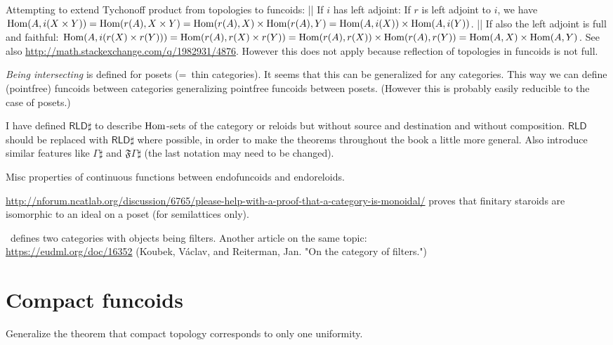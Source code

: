 \documentclass{amsart}
\begin{document}
Attempting to extend Tychonoff product from topologies to funcoids:
|| If $i$ has left adjoint:
If $r$ is left adjoint to $i$, we have $\operatorname{Hom}(A, i(X\times Y)) = \operatorname{Hom}(r(A), X\times Y) = \operatorname{Hom}(r(A), X)\times \operatorname{Hom}(r(A), Y) = \operatorname{Hom}(A, i(X))\times \operatorname{Hom}(A, i(Y))$.
|| If also the left adjoint is full and faithful:
$\operatorname{Hom}(A, i(r(X)\times r(Y))) = \operatorname{Hom}(r(A), r(X)\times r(Y)) = \operatorname{Hom}(r(A), r(X))\times \operatorname{Hom}(r(A), r(Y)) = \operatorname{Hom}(A, X)\times \operatorname{Hom}(A, Y)$.
See also \url{http://math.stackexchange.com/q/1982931/4876}. However this does not apply because reflection of topologies in funcoids
is not full.

\emph{Being intersecting} is defined for posets (=~thin categories). It seems that this can be generalized for any categories.
This way we can define (pointfree) funcoids between categories generalizing pointfree funcoids between posets.
(However this is probably easily reducible to the case of posets.)

I have defined $\mathsf{RLD}\sharp$ to describe $\operatorname{Hom}$-sets of the category or reloids but without source and destination and without composition.
$\mathsf{RLD}$ should be replaced with $\mathsf{RLD}\sharp$ where possible, in order to make the theorems throughout the book a little more general.
Also introduce similar features like $\Gamma\sharp$ and $\mathfrak{F}\Gamma\sharp$ (the last notation may need to be changed).

Misc properties of continuous functions between endofuncoids and endoreloids.

\url{http://nforum.ncatlab.org/discussion/6765/please-help-with-a-proof-that-a-category-is-monoidal/} proves that
finitary staroids are isomorphic to an ideal on a poset (for semilattices only).

\cite{filt-cat}~defines two categories with objects being filters. Another article on the same topic:\\
\url{https://eudml.org/doc/16352} (Koubek, V\'aclav, and Reiterman, Jan. "On the category of filters.")


\section{Compact funcoids}

Generalize the theorem that compact topology corresponds to only one uniformity.
\end{document}
